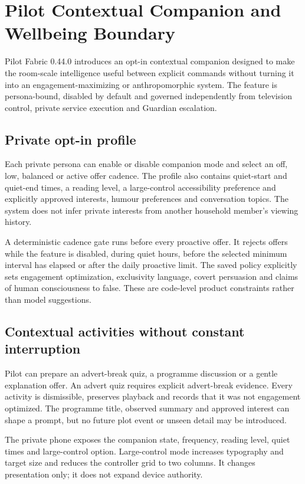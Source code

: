 \section{Pilot Contextual Companion and Wellbeing Boundary}
\label{sec:pilot-contextual-companion}

Pilot Fabric 0.44.0 introduces an opt-in contextual companion designed to make the
room-scale intelligence useful between explicit commands without turning it into an
engagement-maximizing or anthropomorphic system.  The feature is persona-bound, disabled
by default and governed independently from television control, private service execution
and Guardian escalation.

\subsection{Private opt-in profile}

Each private persona can enable or disable companion mode and select an off, low, balanced
or active offer cadence.  The profile also contains quiet-start and quiet-end times, a
reading level, a large-control accessibility preference and explicitly approved interests,
humour preferences and conversation topics.  The system does not infer private interests
from another household member's viewing history.

A deterministic cadence gate runs before every proactive offer.  It rejects offers while
the feature is disabled, during quiet hours, before the selected minimum interval has
elapsed or after the daily proactive limit.  The saved policy explicitly sets engagement
optimization, exclusivity language, covert persuasion and claims of human consciousness to
false.  These are code-level product constraints rather than model suggestions.

\subsection{Contextual activities without constant interruption}

Pilot can prepare an advert-break quiz, a programme discussion or a gentle explanation
offer.  An advert quiz requires explicit advert-break evidence.  Every activity is
dismissible, preserves playback and records that it was not engagement optimized.  The
programme title, observed summary and approved interest can shape a prompt, but no future
plot event or unseen detail may be introduced.

The private phone exposes the companion state, frequency, reading level, quiet times and
large-control option.  Large-control mode increases typography and target size and reduces
the controller grid to two columns.  It changes presentation only; it does not expand
device authority.

